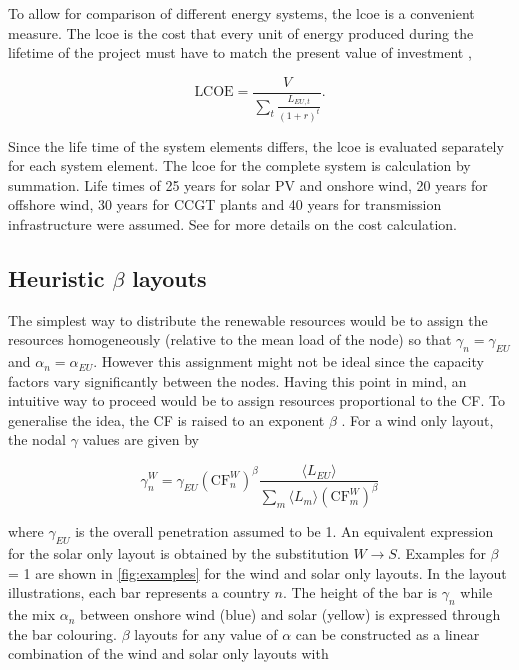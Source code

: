 \documentclass[a4paper, 5p, sort&compress]{elsarticle}%
\newcommand{\paren}[1]{\left(#1\right)}
\begin{document}
To allow for comparison of different energy systems, the \gls{lcoe} is a convenient measure. The \gls{lcoe} is the
cost that every unit of energy produced during the lifetime of the
project must have to match the present value of investment
\cite{Short1995},

\begin{equation}
  \label{eq:7}
  \text{LCOE} = \frac{V}{\sum_{t} \frac{L_{EU,
        t}}{\paren{1+r}^{t}}} .
\end{equation}

Since the life time of the system elements differs, the \gls{lcoe} is
evaluated separately for each system element. The \gls{lcoe} for the
complete system is calculation by summation. Life times of 25 years
for solar PV and onshore wind, 20 years for offshore wind, 30 years
for CCGT plants and 40 years for transmission infrastructure were
assumed. See \cite{Sensitivity} for more details on the cost
calculation.

\subsection{Heuristic $\beta$ layouts}
\label{sec:beta-layout}

The simplest way to distribute the renewable resources would be to
assign the resources homogeneously (relative to the mean load of the
node) so that $\gamma_{n} = \gamma_{EU}$ and $\alpha_{n} = \alpha_{EU}$. However this assignment
might not be ideal since the capacity factors vary significantly
between the nodes. Having this point in mind, an intuitive way to
proceed would be to assign resources proportional to the CF. To
generalise the idea, the CF is raised to an exponent $\beta$ %
\cite{Rolando}. For a wind only layout, the nodal $\gamma$ values are given by

\begin{equation}
  \label{eq:8}
  \gamma_{n}^{W} = \gamma_{EU} \paren{\text{CF}^{W}_{n}}^{\beta} \frac{\langle L_{EU}
    \rangle}{\sum_{m} \langle L_{m}
    \rangle \paren{\text{CF}^{W}_{m}}^{\beta}}
\end{equation}

where $\gamma_{EU}$ is the overall penetration assumed to be 1. An equivalent
expression for the solar only layout is obtained by the substitution
$W \to S$. Examples for $\beta$ = 1 are shown in \cref{fig:examples} for the wind and solar only layouts. In
the layout illustrations, each bar represents a country $n$. The
height of the bar is $\gamma_{n}$ while the mix $\alpha_{n}$ between onshore
wind (blue) and solar (yellow) is expressed through the bar
colouring. $\beta$ layouts for any value of $\alpha$ can be constructed as a
linear combination of the wind and solar only layouts with
\end{document}

